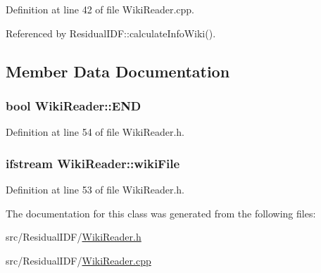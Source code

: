 \-Definition at line 42 of file \-Wiki\-Reader.\-cpp.



\-Referenced by \-Residual\-I\-D\-F\-::calculate\-Info\-Wiki().



\subsection{\-Member \-Data \-Documentation}
\hypertarget{classWikiReader_a181c24ed7fc81ab83a916eb7f307cf54}{
\subsubsection[{\-E\-N\-D}]{\setlength{\rightskip}{0pt plus 5cm}bool {\bf \-Wiki\-Reader\-::\-E\-N\-D}}}\label{classWikiReader_a181c24ed7fc81ab83a916eb7f307cf54}


\-Definition at line 54 of file \-Wiki\-Reader.\-h.

\hypertarget{classWikiReader_a37829cc72dad2f2ca2e67088b6dafdf8}{
\subsubsection[{wiki\-File}]{\setlength{\rightskip}{0pt plus 5cm}ifstream {\bf \-Wiki\-Reader\-::wiki\-File}}}\label{classWikiReader_a37829cc72dad2f2ca2e67088b6dafdf8}


\-Definition at line 53 of file \-Wiki\-Reader.\-h.



\-The documentation for this class was generated from the following files\-:\begin{DoxyCompactItemize}
\item 
src/\-Residual\-I\-D\-F/\hyperlink{WikiReader_8h}{\-Wiki\-Reader.\-h}\item 
src/\-Residual\-I\-D\-F/\hyperlink{WikiReader_8cpp}{\-Wiki\-Reader.\-cpp}\end{DoxyCompactItemize}
